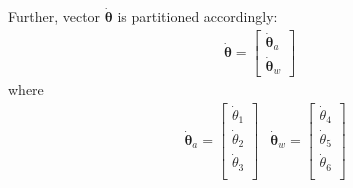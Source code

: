 \documentclass[conference]{IEEEtran}
\begin{document}
Further, vector $\mathbf{\dot{\theta}}$ is partitioned accordingly:
\begin{align}
    \mathbf{\dot{\theta}} = \begin{bmatrix}
                                \mathbf{\dot{\theta}}_a \\
                                \mathbf{\dot{\theta}}_w
                            \end{bmatrix}
\end{align}
where
\begin{align}
     & \mathbf{\dot{\theta}}_a = \begin{bmatrix}
                                     \dot{\theta}_1 \\
                                     \dot{\theta}_2 \\
                                     \dot{\theta}_3 \\
                                 \end{bmatrix}
     & \mathbf{\dot{\theta}}_w = \begin{bmatrix}
                                     \dot{\theta}_4 \\
                                     \dot{\theta}_5 \\
                                     \dot{\theta}_6 \\
                                 \end{bmatrix}
\end{align}
\end{document}
